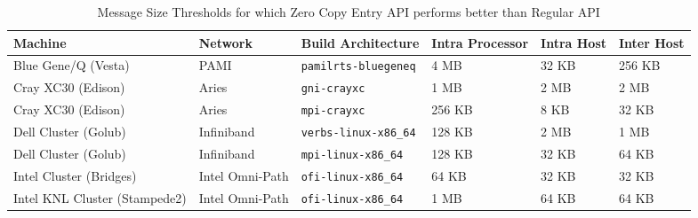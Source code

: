 \begin{table}[ht]
\begin{tabular}{|p{4cm}|p{1.5cm}|p{4cm}|p{1.5cm}|p{1.5cm}|p{1.5cm}|}
\hline
Machine & Network & Build Architecture & Intra Processor & Intra Host & Inter Host
\\\hline
Blue Gene/Q (Vesta) & PAMI & \verb|pamilrts-bluegeneq| & 4 MB & 32 KB & 256 KB
\\\hline
Cray XC30 (Edison) & Aries & \verb|gni-crayxc| & 1 MB & 2 MB & 2 MB
\\\hline
Cray XC30 (Edison) & Aries & \verb|mpi-crayxc| & 256 KB & 8 KB & 32 KB
\\\hline
Dell Cluster (Golub) & Infiniband &\verb|verbs-linux-x86_64| & 128 KB & 2 MB & 1 MB
\\\hline
Dell Cluster (Golub) & Infiniband &\verb|mpi-linux-x86_64| & 128 KB & 32 KB & 64 KB
\\\hline
Intel Cluster (Bridges) & Intel Omni-Path &\verb|ofi-linux-x86_64| & 64 KB & 32 KB & 32 KB
\\\hline
Intel KNL Cluster (Stampede2) & Intel Omni-Path &\verb|ofi-linux-x86_64| & 1 MB & 64 KB & 64 KB
\\\hline
\end{tabular}
\caption{Message Size Thresholds for which Zero Copy Entry API performs better than Regular API}
\label{tab:rdmathreshold}
\end{table}
